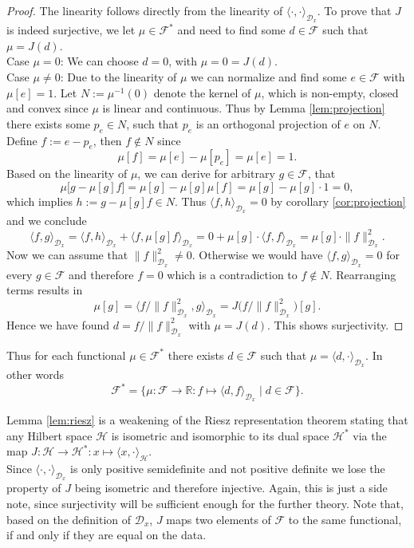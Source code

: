 \documentclass[11pt, a4paper]{article}
\newcommand{\R}{\mathds{R}}
\newcommand{\D}{\mathcal{D}}
\newcommand{\F}{\mathcal{F}}
\renewcommand{\H}{\mathcal{H}}
\begin{document}
\begin{proof}
The linearity follows directly from the linearity of $\langle \cdot, \cdot \rangle_{\D_x}$. To prove that $J$ is indeed surjective, we let $\mu \in \F^*$ and need to find some $d \in \F$ such that $\mu = J(d)$. \\

Case $\mu=0$: We can choose $d=0$, with $\mu = 0 = J(d)$. \\

Case $\mu \neq 0$: Due to the linearity of $\mu$ we can normalize and find some $e \in \F$ with $\mu[e] = 1$. Let $N:=\mu^{-1}(0)$ denote the kernel of $\mu$, which is non-empty, closed and convex since $\mu$ is linear and continuous. Thus by Lemma \ref{lem:projection} there exists some $p_e \in N$, such that $p_e$ is an orthogonal projection of $e$ on $N$. Define $f := e - p_e$, then $f \notin N$ since
\[ \mu[f] = \mu[e] - \mu[p_e] = \mu[e] = 1. \]
Based on the linearity of $\mu$, we can derive for arbitrary $g \in \F$, that
\[ \mu \big [g- \mu[g]f \big] = \mu[g] - \mu[g] \mu[f] = \mu[g] - \mu[g] \cdot 1 = 0 , \]
which implies $h := g - \mu[g]f \in N$. Thus $\langle f , h \rangle_{\D_x} = 0$ by corollary \ref{cor:projection} and we conclude
\[ \langle f, g \rangle_{\D_x} = \langle f , h \rangle_{\D_x} + \langle f , \mu[g]f \rangle_{\D_x} = 0 + \mu[g] \cdot \langle f , f \rangle_{\D_x} = \mu[g] \cdot \| f \|_{\D_x}^2. \]
Now we can assume that $\| f \|_{\D_x}^2 \neq 0$. Otherwise we would have $\langle f, g \rangle_{\D_x} = 0$ for every $g \in \F$ and therefore $f = 0$ which is a contradiction to $f \notin N$. Rearranging terms results in
\[ \mu[g] = \big \langle f / \| f \|_{\D_x}^2 , g \big \rangle_{\D_x} = J \big (f / \| f \|_{\D_x}^2 \big)[g]. \]
Hence we have found $d = f / \| f \|_{\D_x}^2$ with $\mu = J(d)$. This shows surjectivity.
\end{proof}

Thus for each functional $\mu \in \F^*$ there exists $d \in \F$ such that $\mu = \langle d, \cdot \rangle_{\D_x}$. In other words
\[ \F^* = \Big \{ \mu : \F \to \R : f \mapsto \langle d,f \rangle _{\D_x} \mid d \in \F \Big \}. \]

Lemma \ref{lem:riesz} is a weakening of the Riesz representation theorem stating that any Hilbert space $\H$ is isometric and isomorphic to its dual space $\H^*$ via the map $J:\H \to \H^* : x \mapsto \langle x , \cdot \rangle_\H$. \\

Since $\langle \cdot , \cdot \rangle_{\D_x}$ is only positive semidefinite and not positive definite we lose the property of $J$ being isometric and therefore injective. Again, this is just a side note, since surjectivity will be sufficient enough for the further theory. Note that, based on the definition of $\D_x$, $J$ maps two elements of $\F$ to the same functional, if and only if they are equal on the data.  \\
\end{document}
